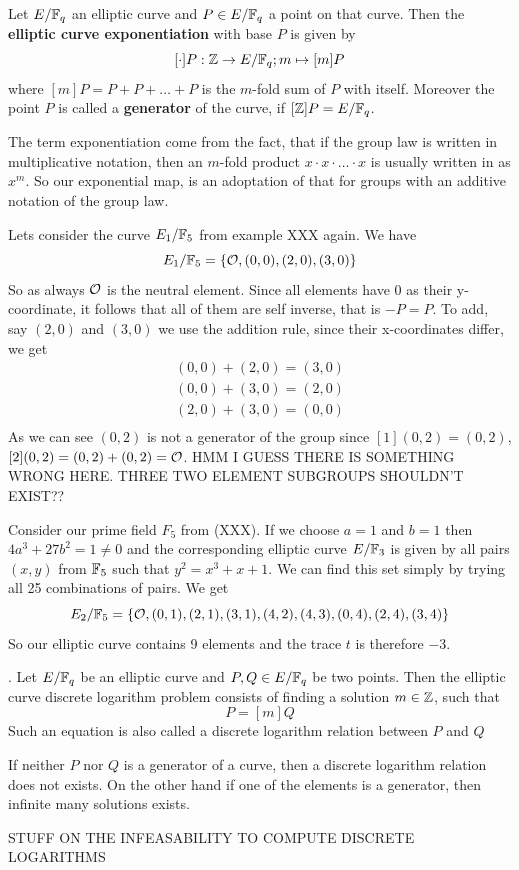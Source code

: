 \begin{definition}
Let $E/\mathbb{F}_q$ an elliptic curve and $P\in E/\mathbb{F}_q$ a point on that curve. Then the \textbf{elliptic curve exponentiation} with base $P$ is given by
$$
[\cdot]P: \mathbb{Z} \to E/\mathbb{F}_q; m \mapsto [m]P
$$
where $[m]P = P+P+\ldots + P$ is the $m$-fold sum of $P$ with itself. Moreover the point $P$ is called a \textbf{generator} of the curve, if $[\mathbb{Z}]P = E/\mathbb{F}_q$.
\end{definition}
\begin{remark}
The term exponentiation come from the fact, that if the group law is written in multiplicative notation, then an $m$-fold product $x\cdot x\cdot\ldots \cdot x$ is usually written in as $x^m$. So our exponential map, is an adoptation of that for groups with an additive notation of the group law.
\end{remark}
\begin{example}Lets consider the curve $E_1/\mathbb{F}_5$ from example XXX again. We have 
$$
E_1/\mathbb{F}_5 = \{\mathcal{O}, (0,0),(2,0),(3,0)\}
$$
So as always $\mathcal{O}$ is the neutral element. Since all elements have $0$ as their y-coordinate, it follows that all of them are self inverse, that is $-P=P$. To add, say $(2,0)$ and $(3,0)$ we use the addition rule, since their x-coordinates differ, we get 
\begin{align*}
(0,0)+(2,0)= \left(3,0\right)\\
(0,0)+(3,0)= \left(2,0\right)\\
(2,0)+(3,0)= \left(0,0\right)\\ 
\end{align*}
As we can see $(0,2)$ is not a generator of the group since 
$[1](0,2)=(0,2)$, $[2](0,2)=(0,2)+(0,2)= \mathcal{O}$. HMM I GUESS THERE IS SOMETHING WRONG HERE. THREE TWO ELEMENT SUBGROUPS SHOULDN'T EXIST??
\end{example}
\begin{example}Consider our prime field $F_5$ from (XXX). If we choose $a=1$ and $b=1$ then $4a^3+ 27b^2 = 1 \neq  0 $ and the corresponding elliptic curve $E/\mathbb{F}_{3}$ is given by all pairs $(x,y)$ from $\mathbb{F}_5$ such that $y^2=x^3+x+1$. We can find this set simply by trying all 25 combinations of pairs. We get
$$
E_2/\mathbb{F}_5 = \{\mathcal{O}, (0,1),(2,1),(3,1),(4,2),(4,3),(0,4),(2,4),(3,4)\}
$$
So our elliptic curve contains 9 elements and the trace $t$ is therefore $-3$.
\end{example}
\begin{definition}. Let $E/\mathbb{F}_q$ be an elliptic curve and $P,Q\in E/\mathbb{F}_q$ be two points. Then the elliptic curve discrete logarithm problem consists of finding a solution $m\in\mathbb{Z}$, such that
$$
P = [m]Q
$$
Such an equation is also called a discrete logarithm relation between $P$ and $Q$
\end{definition}
\begin{remark}
If neither $P$ nor $Q$ is a generator of a curve, then a discrete logarithm relation does not exists. On the other hand if one of the elements is a generator, then infinite many solutions exists. 
\end{remark}
STUFF ON THE INFEASABILITY TO COMPUTE DISCRETE LOGARITHMS

